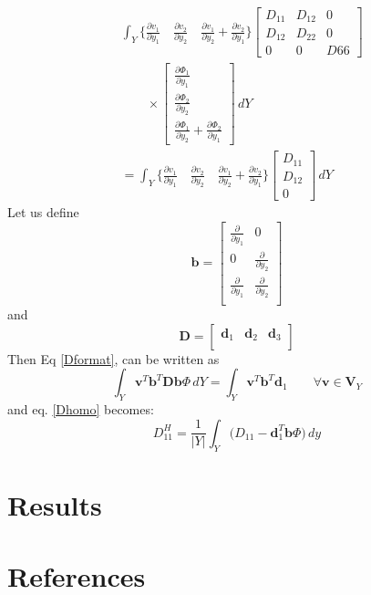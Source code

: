 \documentclass[10pt]{article}
\begin{document}
\begin{equation}
\begin{split}
&\int_Y\bigg\{\frac{\partial v_1}{\partial y_1}\quad\frac{\partial v_2}{\partial y_2}\quad\frac{\partial v_1}{\partial y_2}+\frac{\partial v_2}{\partial y_1}\bigg\}
\begin{bmatrix}
D_{11}	& D_{12} & 	0 \\
D_{12}	& D_{22} & 	0 \\
0		& 0		&	D66
\end{bmatrix}\\
&\qquad\times
\begin{bmatrix}
\frac{\partial \Phi_1}{\partial y_1}\\
\frac{\partial \Phi_2}{\partial y_2}\\
\frac{\partial \Phi_1}{\partial y_2}+\frac{\partial \Phi_2}{\partial y_1}
\end{bmatrix}\,dY\\
&=\int_Y\bigg\{\frac{\partial v_1}{\partial y_1}\quad\frac{\partial v_2}{\partial y_2}\quad\frac{\partial v_1}{\partial y_2}+\frac{\partial v_2}{\partial y_1}\bigg\}
\begin{bmatrix}
D_{11}\\
D_{12}\\
0
\end{bmatrix}\,dY
\end{split}
\end{equation}
Let us define
\begin{equation}
\textbf{b} = \begin{bmatrix}
\frac{\partial}{\partial y_1} & 0\\
0 & \frac{\partial}{\partial y_2}\\
\frac{\partial}{\partial y_1} &\frac{\partial}{\partial y_2}\\
\end{bmatrix}
\end{equation}
and 
\begin{equation}
\textbf{D} = \begin{bmatrix}
\textbf{d}_1 & \textbf{d}_2 & \textbf{d}_3\\
\end{bmatrix}
\end{equation}
Then Eq \eqref{Dformat}, can be written as
\begin{equation}
\int_Y \textbf{v}^T \textbf{b}^T \textbf{D} \textbf{b}\Phi\,dY = \int_Y\textbf{v}^T\textbf{b}^T\textbf{d}_1 \qquad \forall \textbf{v}\in\textbf{V}_Y
\end{equation}
and eq. \eqref{Dhomo} becomes:
\begin{equation}
\boxed{D^H_{11} = \frac{1}{|Y|}\int_Y\bigg (D_{11}-\textbf{d}_1^T\textbf{b}\Phi\bigg )\,dy
}
\end{equation}

\section{Results}
\cite{first}
\cite{WEBSITE:1}


\section{References}


\end{document}
